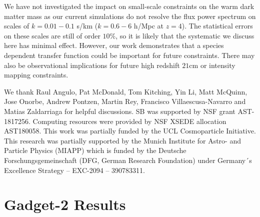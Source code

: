 \documentclass[a4paper,11pt]{article}
\begin{document}
We have not investigated the impact on small-scale constraints on the warm dark matter mass \cite{Irsic:2017} as our current simulations do not resolve the flux power spectrum on scales of $k = 0.01 - 0.1$ s/km ($k = 0.6 - 6$ h/Mpc at $z = 4$). The statistical errors on these scales are still of order $10\%$, so it is likely that the systematic we discuss here has minimal effect. However, our work demonstrates that a species dependent transfer function could be important for future constraints. There may also be observational implications for future high redshift $21$cm or intensity mapping constraints.


\acknowledgments

We thank Raul Angulo, Pat McDonald, Tom Kitching, Yin Li, Matt McQuinn, Jose Onorbe, Andrew Pontzen, Martin Rey, Francisco Villaescusa-Navarro and Matias Zaldarriaga for helpful discussions. SB was supported by NSF grant AST-1817256. Computing resources were provided by NSF XSEDE allocation AST180058. This work was partially funded by the UCL Cosmoparticle Initiative. This research was partially supported by the Munich Institute for Astro- and Particle Physics (MIAPP) which is funded by the Deutsche Forschungsgemeinschaft (DFG, German Research Foundation) under Germany´s Excellence Strategy – EXC-2094 – 390783311.

\appendix

\section{Gadget-2 Results}
\label{ap:gadget2}
\end{document}
